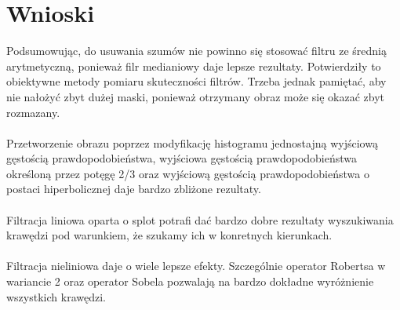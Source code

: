 \documentclass{classrep}
\begin{document}
\section{Wnioski}
Podsumowując, do usuwania szumów nie powinno się stosować filtru ze średnią arytmetyczną, ponieważ filr medianiowy daje lepsze rezultaty. Potwierdziły to obiektywne metody pomiaru skuteczności filtrów. Trzeba jednak pamiętać, aby nie nałożyć zbyt dużej maski, ponieważ otrzymany obraz może się okazać zbyt rozmazany.\\
\\
\indent
Przetworzenie obrazu poprzez modyfikację histogramu jednostajną wyjściową gęstością prawdopodobieństwa, wyjściowa gęstością prawdopodobieństwa określoną przez potęgę 2/3 oraz wyjściową gęstością prawdopodobieństwa o postaci hiperbolicznej daje bardzo zbliżone rezultaty.\\
\\
\indent
Filtracja liniowa oparta o splot potrafi dać bardzo dobre rezultaty wyszukiwania krawędzi pod warunkiem, że szukamy ich w konretnych kierunkach.\\
\\
\indent
Filtracja nieliniowa daje o wiele lepsze efekty. Szczególnie operator Robertsa w wariancie 2 oraz operator Sobela pozwalają na bardzo dokładne wyróżnienie wszystkich krawędzi.

\begin{thebibliography}{1}
\\
\end{thebibliography}
\end{document}

